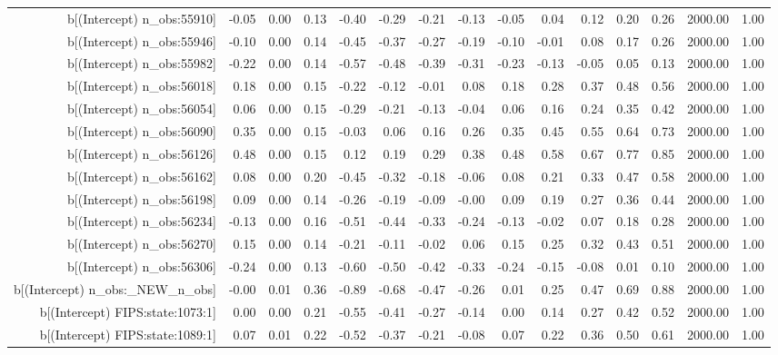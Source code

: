 \begin{table}[ht]
\begin{tabular}{rrrrrrrrrrrrrrr}
  b[(Intercept) n\_obs:55910] & -0.05 & 0.00 & 0.13 & -0.40 & -0.29 & -0.21 & -0.13 & -0.05 & 0.04 & 0.12 & 0.20 & 0.26 & 2000.00 & 1.00 \\ 
  b[(Intercept) n\_obs:55946] & -0.10 & 0.00 & 0.14 & -0.45 & -0.37 & -0.27 & -0.19 & -0.10 & -0.01 & 0.08 & 0.17 & 0.26 & 2000.00 & 1.00 \\ 
  b[(Intercept) n\_obs:55982] & -0.22 & 0.00 & 0.14 & -0.57 & -0.48 & -0.39 & -0.31 & -0.23 & -0.13 & -0.05 & 0.05 & 0.13 & 2000.00 & 1.00 \\ 
  b[(Intercept) n\_obs:56018] & 0.18 & 0.00 & 0.15 & -0.22 & -0.12 & -0.01 & 0.08 & 0.18 & 0.28 & 0.37 & 0.48 & 0.56 & 2000.00 & 1.00 \\ 
  b[(Intercept) n\_obs:56054] & 0.06 & 0.00 & 0.15 & -0.29 & -0.21 & -0.13 & -0.04 & 0.06 & 0.16 & 0.24 & 0.35 & 0.42 & 2000.00 & 1.00 \\ 
  b[(Intercept) n\_obs:56090] & 0.35 & 0.00 & 0.15 & -0.03 & 0.06 & 0.16 & 0.26 & 0.35 & 0.45 & 0.55 & 0.64 & 0.73 & 2000.00 & 1.00 \\ 
  b[(Intercept) n\_obs:56126] & 0.48 & 0.00 & 0.15 & 0.12 & 0.19 & 0.29 & 0.38 & 0.48 & 0.58 & 0.67 & 0.77 & 0.85 & 2000.00 & 1.00 \\ 
  b[(Intercept) n\_obs:56162] & 0.08 & 0.00 & 0.20 & -0.45 & -0.32 & -0.18 & -0.06 & 0.08 & 0.21 & 0.33 & 0.47 & 0.58 & 2000.00 & 1.00 \\ 
  b[(Intercept) n\_obs:56198] & 0.09 & 0.00 & 0.14 & -0.26 & -0.19 & -0.09 & -0.00 & 0.09 & 0.19 & 0.27 & 0.36 & 0.44 & 2000.00 & 1.00 \\ 
  b[(Intercept) n\_obs:56234] & -0.13 & 0.00 & 0.16 & -0.51 & -0.44 & -0.33 & -0.24 & -0.13 & -0.02 & 0.07 & 0.18 & 0.28 & 2000.00 & 1.00 \\ 
  b[(Intercept) n\_obs:56270] & 0.15 & 0.00 & 0.14 & -0.21 & -0.11 & -0.02 & 0.06 & 0.15 & 0.25 & 0.32 & 0.43 & 0.51 & 2000.00 & 1.00 \\ 
  b[(Intercept) n\_obs:56306] & -0.24 & 0.00 & 0.13 & -0.60 & -0.50 & -0.42 & -0.33 & -0.24 & -0.15 & -0.08 & 0.01 & 0.10 & 2000.00 & 1.00 \\ 
  b[(Intercept) n\_obs:\_NEW\_n\_obs] & -0.00 & 0.01 & 0.36 & -0.89 & -0.68 & -0.47 & -0.26 & 0.01 & 0.25 & 0.47 & 0.69 & 0.88 & 2000.00 & 1.00 \\ 
  b[(Intercept) FIPS:state:1073:1] & 0.00 & 0.00 & 0.21 & -0.55 & -0.41 & -0.27 & -0.14 & 0.00 & 0.14 & 0.27 & 0.42 & 0.52 & 2000.00 & 1.00 \\ 
  b[(Intercept) FIPS:state:1089:1] & 0.07 & 0.01 & 0.22 & -0.52 & -0.37 & -0.21 & -0.08 & 0.07 & 0.22 & 0.36 & 0.50 & 0.61 & 2000.00 & 1.00 \\ 

\end{tabular}
\end{table}
